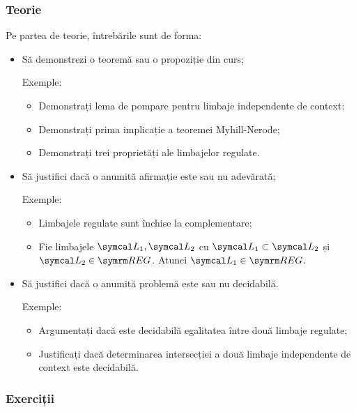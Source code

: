 \subsubsection*{Teorie}
Pe partea de teorie, întrebările sunt de forma:
\begin{itemize}
    \item Să demonstrezi o teoremă sau o propoziție din curs;

          Exemple:
          \begin{itemize}
              \item Demonstrați lema de pompare pentru limbaje independente de context;
              \item Demonstrați prima implicație a teoremei Myhill-Nerode;
              \item Demonstrați trei proprietăți ale limbajelor regulate.
          \end{itemize}

    \item Să justifici dacă o anumită afirmație este sau nu adevărată;

          Exemple:
          \begin{itemize}
              \item Limbajele regulate sunt închise la complementare;
              \item Fie limbajele \(\limbaj_1, \limbaj_2\) cu \(\limbaj_1 \subset \limbaj_2\) și \(\limbaj_2 \in \reglang\). Atunci \(\limbaj_1 \in \reglang\).
          \end{itemize}

    \item Să justifici dacă o anumită problemă este sau nu decidabilă.

          Exemple:
          \begin{itemize}
              \item Argumentați dacă este decidabilă egalitatea între două limbaje regulate;
              \item Justificați dacă determinarea intersecției a două limbaje independente de context este decidabilă.
          \end{itemize}
\end{itemize}

\subsubsection*{Exerciții}

